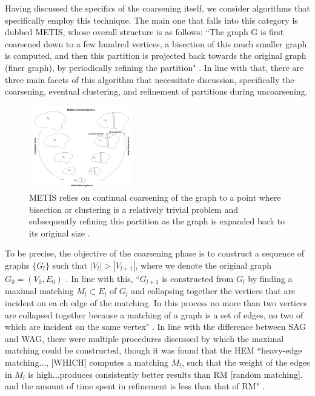 \documentclass[journal]{IEEEtran}
\begin{document}
Having discussed the specifics of the coarsening itself, we consider algorithms that specifically employ this technique. The main one that falls into this category is dubbed METIS, whose overall structure is as follows: ``The graph G is first coarsened down to a few hundred vertices, a bisection of this much smaller graph is computed, and then this partition is projected back towards the original graph (finer graph), by periodically refining the partition" \cite{metis}. In line with that, there are three main facets of this algorithm that necessitate discussion, specifically the coarsening, eventual clustering, and refinement of partitions during uncoarsening.

\begin{figure}
    \label{fig:metis}
    \centering
    \includegraphics[width=0.4\textwidth]{metis.png}
    \caption{METIS relies on continual coarsening of the graph to a point where bisection or clustering is a relatively trivial problem and subsequently refining this partition as the graph is expanded back to its original size \cite{metis}.}
\end{figure}

To be precise, the objective of the coarsening phase is to construct a sequence of graphs $\{G_{l}\}$ such that $|V_{l}| > |V_{l+1}|$, where we denote the original graph $G_{0}=(V_0,E_0)$ \cite{metis}. In line with this, ``$G_{l+1}$ is constructed from $G_l$ by finding a maximal matching $M_l\subset E_l$ of $G_l$ and collapsing together the vertices that are incident on ea ch edge of the matching. In this process no more than two vertices are collapsed together because a matching of a graph is a set of edges, no two of which are incident on the same vertex" \cite{metis}. In line with the difference between SAG and WAG, there were multiple procedures discussed by which the maximal matching could be constructed, though it was found that the HEM ``heavy-edge matching..., [WHICH] computes a matching $M_l$, such that the weight of the edges in $M_l$ is high...produces consistently better results than RM [random matching], and the amount of time spent in refinement is less than that of RM" \cite{metis}.
\end{document}
